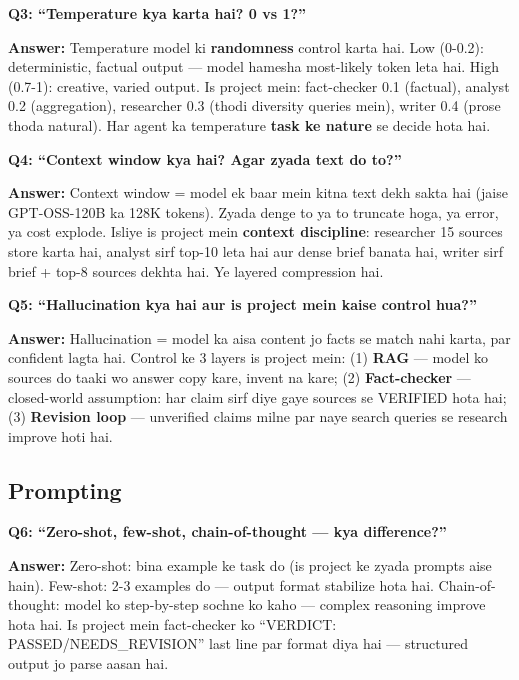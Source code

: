 \begin{interviewbox}
\textbf{Q3: ``Temperature kya karta hai? 0 vs 1?''}

\textbf{Answer:} Temperature model ki \textbf{randomness} control karta hai. Low (0-0.2): deterministic, factual output --- model hamesha most-likely token leta hai. High (0.7-1): creative, varied output. Is project mein: fact-checker 0.1 (factual), analyst 0.2 (aggregation), researcher 0.3 (thodi diversity queries mein), writer 0.4 (prose thoda natural). Har agent ka temperature \textbf{task ke nature} se decide hota hai.
\end{interviewbox}

\begin{interviewbox}
\textbf{Q4: ``Context window kya hai? Agar zyada text do to?''}

\textbf{Answer:} Context window = model ek baar mein kitna text dekh sakta hai (jaise GPT-OSS-120B ka 128K tokens). Zyada denge to ya to truncate hoga, ya error, ya cost explode. Isliye is project mein \textbf{context discipline}: researcher 15 sources store karta hai, analyst sirf top-10 leta hai aur dense brief banata hai, writer sirf brief + top-8 sources dekhta hai. Ye layered compression hai.
\end{interviewbox}

\begin{interviewbox}
\textbf{Q5: ``Hallucination kya hai aur is project mein kaise control hua?''}

\textbf{Answer:} Hallucination = model ka aisa content jo facts se match nahi karta, par confident lagta hai. Control ke 3 layers is project mein: (1) \textbf{RAG} --- model ko sources do taaki wo answer copy kare, invent na kare; (2) \textbf{Fact-checker} --- closed-world assumption: har claim sirf diye gaye sources se VERIFIED hota hai; (3) \textbf{Revision loop} --- unverified claims milne par naye search queries se research improve hoti hai.
\end{interviewbox}

\subsection{Prompting}

\begin{interviewbox}
\textbf{Q6: ``Zero-shot, few-shot, chain-of-thought --- kya difference?''}

\textbf{Answer:} Zero-shot: bina example ke task do (is project ke zyada prompts aise hain). Few-shot: 2-3 examples do --- output format stabilize hota hai. Chain-of-thought: model ko step-by-step sochne ko kaho --- complex reasoning improve hota hai. Is project mein fact-checker ko ``VERDICT: PASSED/NEEDS\_REVISION'' last line par format diya hai --- structured output jo parse aasan hai.
\end{interviewbox}


